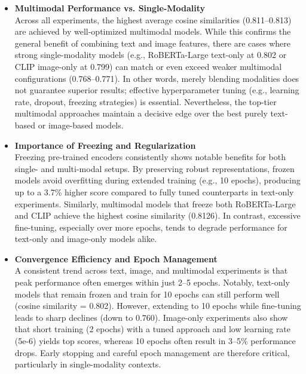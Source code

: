\begin{itemize}
    \item \textbf{Multimodal Performance vs. Single-Modality}  \\
    Across all experiments, the highest average cosine similarities (0.811--0.813) are achieved by well-optimized multimodal models. While this confirms the general benefit of combining text and image features, there are cases where strong single-modality models (e.g., RoBERTa-Large text-only at 0.802 or CLIP image-only at 0.799) can match or even exceed weaker multimodal configurations (0.768--0.771). In other words, merely blending modalities does not guarantee superior results; effective hyperparameter tuning (e.g., learning rate, dropout, freezing strategies) is essential. Nevertheless, the top-tier multimodal approaches maintain a decisive edge over the best purely text-based or image-based models.

    \item \textbf{Importance of Freezing and Regularization}  \\
    Freezing pre-trained encoders consistently shows notable benefits for both single- and multi-modal setups. By preserving robust representations, frozen models avoid overfitting during extended training (e.g., 10 epochs), producing up to a 3.7\% higher score compared to fully tuned counterparts in text-only experiments. Similarly, multimodal models that freeze both RoBERTa-Large and CLIP achieve the highest cosine similarity (0.8126). In contrast, excessive fine-tuning, especially over more epochs, tends to degrade performance for text-only and image-only models alike.

    \item \textbf{Convergence Efficiency and Epoch Management}  \\
    A consistent trend across text, image, and multimodal experiments is that peak performance often emerges within just 2--5 epochs. Notably, text-only models that remain frozen and train for 10 epochs can still perform well (cosine similarity = 0.802). However, extending to 10 epochs while fine-tuning leads to sharp declines (down to 0.760). Image-only experiments also show that short training (2 epochs) with a tuned approach and low learning rate (5e-6) yields top scores, whereas 10 epochs often result in 3--5\% performance drops. Early stopping and careful epoch management are therefore critical, particularly in single-modality contexts.


\end{itemize}
